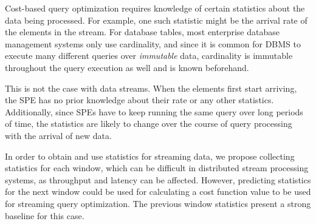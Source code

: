 Cost-based query optimization requires knowledge of certain statistics about the data being processed. For example, one such statistic might be the arrival rate of the elements in the stream. For database tables, most enterprise database management systems only use cardinality, and since it is common for DBMS to execute many different queries over \textit{immutable} data, cardinality is immutable throughout the query execution as well and is known beforehand. 

This is not the case with data streams. When the elements first start arriving, the SPE has no prior knowledge about their rate or any other statistics. Additionally, since SPEs have to keep running the same query over long periods of time, the statistics are likely to change over the course of query processing with the arrival of new data. 

In order to obtain and use statistics for streaming data, we propose collecting statistics for each window, which can be difficult in distributed stream processing systems, as throughput and latency can be affected. However, predicting statistics for the next window could be used for calculating a cost function value to be used for streaming query optimization. The previous window statistics present a strong baseline for this case.

